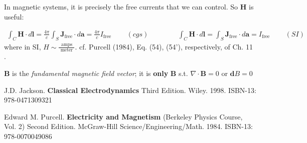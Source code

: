 \documentclass[10pt]{amsart}
\begin{document}
\begin{multicols*}{2}
In magnetic systems, it is precisely the free currents that we can control.  So $\mathbf{H}$ is useful:

\begin{equation}
\begin{gathered}
\int_C \mathbf{H} \cdot d\mathbf{l} = \frac{4\pi}{c}\int_S \mathbf{J}_{\text{free}} \cdot d\mathbf{a} = \frac{4\pi}{c} I_{\text{free}} \qquad \, (cgs) \qquad \qquad \, \int_C \mathbf{H} \cdot d\mathbf{l} = \int_S \mathbf{J}_{\text{free}} \cdot d\mathbf{a} =  I_{\text{free}} \qquad \, (SI)
\end{gathered}
\end{equation}
where in SI, $H \sim \frac{ \text{ amps } }{ \text{ meter } }$.  cf. Purcell (1984), Eq. (54), (54'), respectively, of Ch. 11 \cite{Purc1984}.  

$\mathbf{B}$ is the \emph{fundamental magnetic field vector}; it is \textbf{only} $\mathbf{B}$ s.t. $\nabla \cdot \mathbf{B} =0$ or $\mathbf{d}B=0$  






\end{multicols*}

\begin{thebibliography}{9}

J.D. Jackson.  \textbf{Classical Electrodynamics} Third Edition.  Wiley.  1998.   ISBN-13: 978-0471309321

Edward M. Purcell.  \textbf{Electricity and Magnetism} (Berkeley Physics Course, Vol. 2) Second Edition.  McGraw-Hill Science/Engineering/Math.  1984.  ISBN-13: 978-0070049086

  \end{thebibliography}
\end{document}
